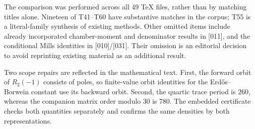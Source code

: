 \documentclass[11pt,a4paper]{article}
\theoremstyle{definition}\newtheorem{definition}[theorem]{Definition}
\theoremstyle{remark}\newtheorem{remark}[theorem]{Remark}
\begin{document}
The comparison was performed across all 49 TeX files, rather than by
matching titles alone. Nineteen of T41--T60 have substantive matches in
the corpus; T55 is a literal-family synthesis of existing methods.
Other omitted items include already incorporated chamber-moment and
denominator results in [011], and the conditional Mills identities in
[010]/[031]. Their omission is an editorial decision to avoid
reprinting existing material as an additional result.

Two scope repairs are reflected in the mathematical text. First,
the forward orbit of $R_2(-1)$ consists of poles, so finite-value orbit
identities for the Erd\H{o}s--Borwein constant use its backward orbit.
Second, the quartic trace period is $260$, whereas the companion
matrix order modulo $30$ is $780$. The embedded certificate checks
both quantities separately and confirms the same densities by both
representations.
\end{document}
